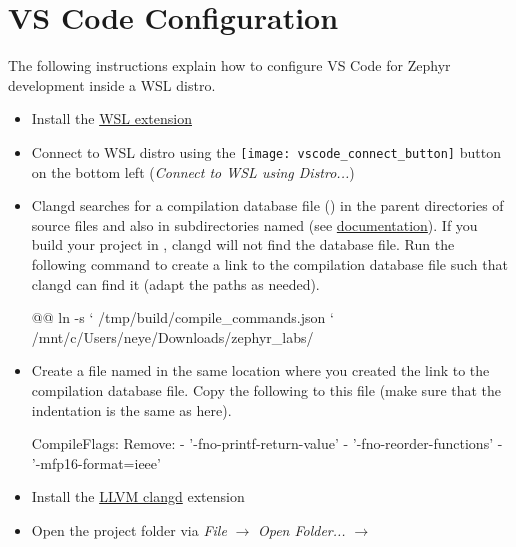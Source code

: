 \section{VS Code Configuration}

The following instructions explain how to configure VS Code for Zephyr development inside a WSL distro.

\begin{itemize}
  \item Install the \href{https://marketplace.visualstudio.com/items?itemName=ms-vscode-remote.remote-wsl}{WSL extension}
  \item Connect to WSL distro using the \texttt{[image: vscode\_connect\_button]} button on the bottom left (\emph{Connect to WSL using Distro...})
  \item Clangd searches for a compilation database file () in the parent directories of source files and also in subdirectories named  (see \href{https://clangd.llvm.org/installation#project-setup}{documentation}).
    If you build your project in , clangd will not find the database file.
    Run the following command to create a link to the compilation database file such that clangd can find it (adapt the paths as needed).

\begin{monobox}
@\cmdinwsl{}@ ln -s `
  /tmp/build/compile_commands.json `
  /mnt/c/Users/neye/Downloads/zephyr_labs/
\end{monobox}
  \item Create a file named  in the same location where you created the link to the compilation database file.
    Copy the following to this file (make sure that the indentation is the same as here).

\begin{monobox}
CompileFlags:
  Remove:
    - '-fno-printf-return-value'
    - '-fno-reorder-functions'
    - '-mfp16-format=ieee'
\end{monobox}
  \item Install the \href{https://marketplace.visualstudio.com/items?itemName=llvm-vs-code-extensions.vscode-clangd}{LLVM clangd} extension
  \item Open the project folder via \emph{File} $\rightarrow$ \emph{Open Folder...} $\rightarrow$ 
\end{itemize}
